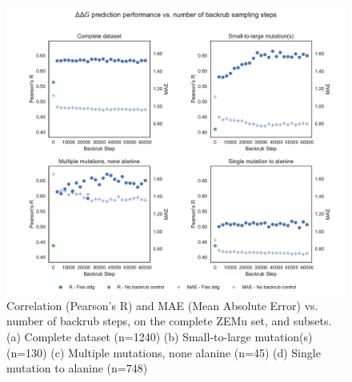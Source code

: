 \begin{figure}
  \includegraphics[width=\textwidth,keepaspectratio]{steps-v-corr.pdf}
  \caption[Flex ddG performance vs. number of backrub steps]{
    Correlation (Pearson's R) and MAE (Mean Absolute Error) vs. number of backrub steps, on the complete ZEMu set, and subsets.
    (a) Complete dataset (n=1240)
    (b) Small-to-large mutation(s) (n=130)
    (c) Multiple mutations, none alanine (n=45)
    (d) Single mutation to alanine (n=748)
  } \label{fig:steps-v-corr}
\end{figure}
